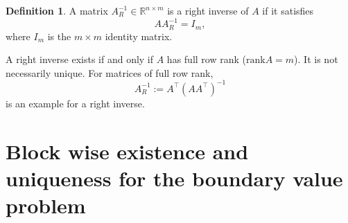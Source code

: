 \documentclass[preprint,12pt]{elsarticle}
\numberwithin{equation}{section}
\theoremstyle{definition}
\newtheorem{definition}[theorem]{Definition}
\begin{document}
\begin{definition}
  A matrix $A_R^{-1}\in\mathbb{R}^{n\times m}$ is a right inverse of $A$ if it satisfies
  \begin{equation*}
      AA_R^{-1}=I_m,
  \end{equation*}
where $I_m$ is the $m\times m$ identity matrix.
\end{definition}
A right inverse exists if and only if $A$ has full row rank ($\text{rank}A=m$).  It is not necessarily unique. For matrices of full row rank, 
\begin{equation}\label{right_inverse}
A_R^{-1} :=A^\top(A A^\top)^{-1}
\end{equation}
is an example for a right inverse.


\section{Block wise existence and uniqueness for the boundary value problem}
\end{document}
